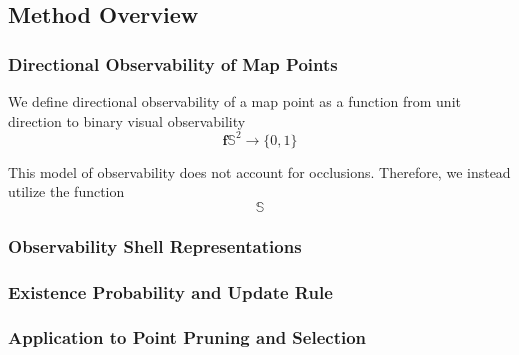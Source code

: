 \subsection{Method Overview}

\subsubsection{Directional Observability of Map Points}


We define directional observability of a map point as a function from unit direction to binary visual observability
$$
    \mathbf{f}\mathbb{S}^2\rightarrow\{0,1\}
$$


This model of observability does not account for occlusions. Therefore, we instead utilize the function
$$
    \mathbb{S}
$$



\subsubsection{Observability Shell Representations}

\subsubsection{Existence Probability and Update Rule}

\subsubsection{Application to Point Pruning and Selection}
